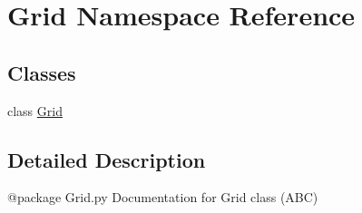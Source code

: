 \hypertarget{namespaceGrid}{\section{Grid Namespace Reference}
\label{namespaceGrid}
}
\subsection*{Classes}
\begin{DoxyCompactItemize}
\item 
class \hyperlink{classGrid_1_1Grid}{Grid}
\end{DoxyCompactItemize}


\subsection{Detailed Description}
\begin{DoxyVerb}@package Grid.py
Documentation for Grid class (ABC)
\end{DoxyVerb}
 